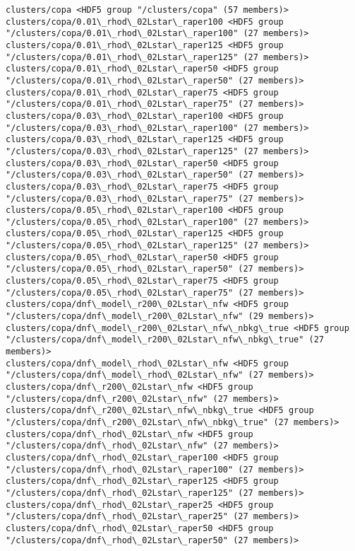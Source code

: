 \documentclass[11pt]{article}
\begin{document}
\begin{Verbatim}[commandchars=\\\{\}]
clusters/copa <HDF5 group "/clusters/copa" (57 members)>
clusters/copa/0.01\_rhod\_02Lstar\_raper100 <HDF5 group "/clusters/copa/0.01\_rhod\_02Lstar\_raper100" (27 members)>
clusters/copa/0.01\_rhod\_02Lstar\_raper125 <HDF5 group "/clusters/copa/0.01\_rhod\_02Lstar\_raper125" (27 members)>
clusters/copa/0.01\_rhod\_02Lstar\_raper50 <HDF5 group "/clusters/copa/0.01\_rhod\_02Lstar\_raper50" (27 members)>
clusters/copa/0.01\_rhod\_02Lstar\_raper75 <HDF5 group "/clusters/copa/0.01\_rhod\_02Lstar\_raper75" (27 members)>
clusters/copa/0.03\_rhod\_02Lstar\_raper100 <HDF5 group "/clusters/copa/0.03\_rhod\_02Lstar\_raper100" (27 members)>
clusters/copa/0.03\_rhod\_02Lstar\_raper125 <HDF5 group "/clusters/copa/0.03\_rhod\_02Lstar\_raper125" (27 members)>
clusters/copa/0.03\_rhod\_02Lstar\_raper50 <HDF5 group "/clusters/copa/0.03\_rhod\_02Lstar\_raper50" (27 members)>
clusters/copa/0.03\_rhod\_02Lstar\_raper75 <HDF5 group "/clusters/copa/0.03\_rhod\_02Lstar\_raper75" (27 members)>
clusters/copa/0.05\_rhod\_02Lstar\_raper100 <HDF5 group "/clusters/copa/0.05\_rhod\_02Lstar\_raper100" (27 members)>
clusters/copa/0.05\_rhod\_02Lstar\_raper125 <HDF5 group "/clusters/copa/0.05\_rhod\_02Lstar\_raper125" (27 members)>
clusters/copa/0.05\_rhod\_02Lstar\_raper50 <HDF5 group "/clusters/copa/0.05\_rhod\_02Lstar\_raper50" (27 members)>
clusters/copa/0.05\_rhod\_02Lstar\_raper75 <HDF5 group "/clusters/copa/0.05\_rhod\_02Lstar\_raper75" (27 members)>
clusters/copa/dnf\_model\_r200\_02Lstar\_nfw <HDF5 group "/clusters/copa/dnf\_model\_r200\_02Lstar\_nfw" (29 members)>
clusters/copa/dnf\_model\_r200\_02Lstar\_nfw\_nbkg\_true <HDF5 group "/clusters/copa/dnf\_model\_r200\_02Lstar\_nfw\_nbkg\_true" (27 members)>
clusters/copa/dnf\_model\_rhod\_02Lstar\_nfw <HDF5 group "/clusters/copa/dnf\_model\_rhod\_02Lstar\_nfw" (27 members)>
clusters/copa/dnf\_r200\_02Lstar\_nfw <HDF5 group "/clusters/copa/dnf\_r200\_02Lstar\_nfw" (27 members)>
clusters/copa/dnf\_r200\_02Lstar\_nfw\_nbkg\_true <HDF5 group "/clusters/copa/dnf\_r200\_02Lstar\_nfw\_nbkg\_true" (27 members)>
clusters/copa/dnf\_rhod\_02Lstar\_nfw <HDF5 group "/clusters/copa/dnf\_rhod\_02Lstar\_nfw" (27 members)>
clusters/copa/dnf\_rhod\_02Lstar\_raper100 <HDF5 group "/clusters/copa/dnf\_rhod\_02Lstar\_raper100" (27 members)>
clusters/copa/dnf\_rhod\_02Lstar\_raper125 <HDF5 group "/clusters/copa/dnf\_rhod\_02Lstar\_raper125" (27 members)>
clusters/copa/dnf\_rhod\_02Lstar\_raper25 <HDF5 group "/clusters/copa/dnf\_rhod\_02Lstar\_raper25" (27 members)>
clusters/copa/dnf\_rhod\_02Lstar\_raper50 <HDF5 group "/clusters/copa/dnf\_rhod\_02Lstar\_raper50" (27 members)>

\end{Verbatim}
\end{document}
